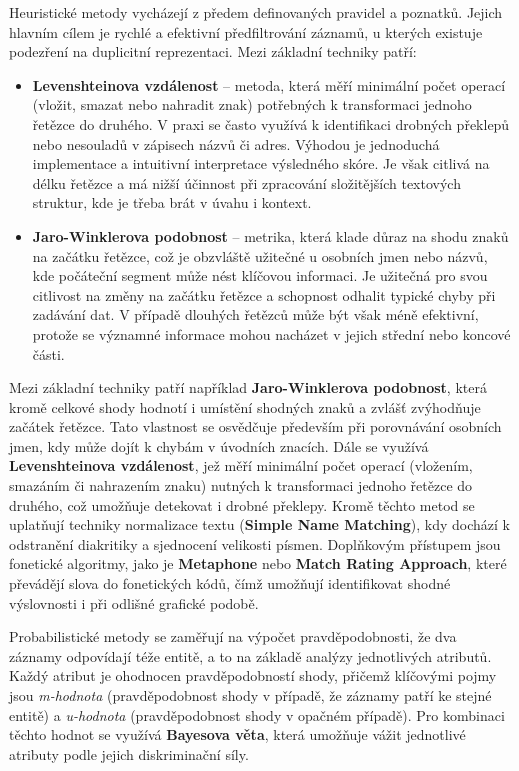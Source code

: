 
Heuristické metody vycházejí z předem definovaných pravidel a poznatků. Jejich hlavním cílem je rychlé a efektivní předfiltrování záznamů, u kterých existuje podezření na duplicitní reprezentaci. Mezi základní techniky patří:

\begin{itemize}
  \item{
        \textbf{Levenshteinova vzdálenost} – metoda, která měří minimální počet operací (vložit, smazat nebo nahradit znak) potřebných k transformaci jednoho řetězce do druhého. V praxi se často využívá k identifikaci drobných překlepů nebo nesouladů v zápisech názvů či adres.
        Výhodou je jednoduchá implementace a intuitivní interpretace výsledného skóre.
        Je však citlivá na délku řetězce a má nižší účinnost při zpracování složitějších textových struktur, kde je třeba brát v úvahu i kontext.
        }
  \item{\textbf{Jaro-Winklerova podobnost} – metrika, která klade důraz na shodu znaků na začátku řetězce, což je obzvláště užitečné u osobních jmen nebo názvů, kde počáteční segment může nést klíčovou informaci.
        Je užitečná pro svou citlivost na změny na začátku řetězce a schopnost odhalit typické chyby při zadávání dat.
        V případě dlouhých řetězců může být však méně efektivní, protože se významné informace mohou nacházet v jejich střední nebo koncové části. }
\end{itemize}

Mezi základní techniky patří například \textbf{Jaro-Winklerova podobnost}, která kromě celkové shody hodnotí i umístění shodných znaků a zvlášť zvýhodňuje začátek řetězce. Tato vlastnost se osvědčuje především při porovnávání osobních jmen, kdy může dojít k chybám v úvodních znacích. Dále se využívá \textbf{Levenshteinova vzdálenost}, jež měří minimální počet operací (vložením, smazáním či nahrazením znaku) nutných k transformaci jednoho řetězce do druhého, což umožňuje detekovat i drobné překlepy. Kromě těchto metod se uplatňují techniky normalizace textu (\textbf{Simple Name Matching}), kdy dochází k odstranění diakritiky a sjednocení velikosti písmen. Doplňkovým přístupem jsou fonetické algoritmy, jako je \textbf{Metaphone} nebo \textbf{Match Rating Approach}, které převádějí slova do fonetických kódů, čímž umožňují identifikovat shodné výslovnosti i při odlišné grafické podobě.

Probabilistické metody se zaměřují na výpočet pravděpodobnosti, že dva záznamy odpovídají téže entitě, a to na základě analýzy jednotlivých atributů. Každý atribut je ohodnocen pravděpodobností shody, přičemž klíčovými pojmy jsou \textit{m-hodnota} (pravděpodobnost shody v případě, že záznamy patří ke stejné entitě) a \textit{u-hodnota} (pravděpodobnost shody v opačném případě). Pro kombinaci těchto hodnot se využívá \textbf{Bayesova věta}, která umožňuje vážit jednotlivé atributy podle jejich diskriminační síly.

